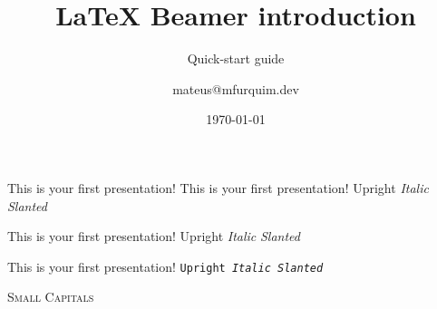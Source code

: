 \documentclass{beamer}
\title {\LaTeX{} Beamer introduction}
\subtitle{Quick-start guide}
\author{mateus@mfurquim.dev}
\institute{MFurquim Dev}
\date{\today}
\begin{document}

\lstset{basicstyle=\footnotesize\ttfamily,breaklines=true}
\begin{frame}
	
\end{frame}


\begin{frame}

    This is your first presentation!
	\newline
    \rmfamily This is your first presentation!
	\newline
	\textup{Upright} \textit{Italic} \textsl{Slanted}
	\newline


    \sffamily This is your first presentation!
	\newline
	\textsf{Upright  \textit{Italic} \textsl{Slanted}}
	\newline

    \ttfamily This is your first presentation!
	\newline
	\texttt{Upright  \textit{Italic} \textsl{Slanted}}
	\newline

	\textsc{Small Capitals}

\end{frame}
\end{document}
